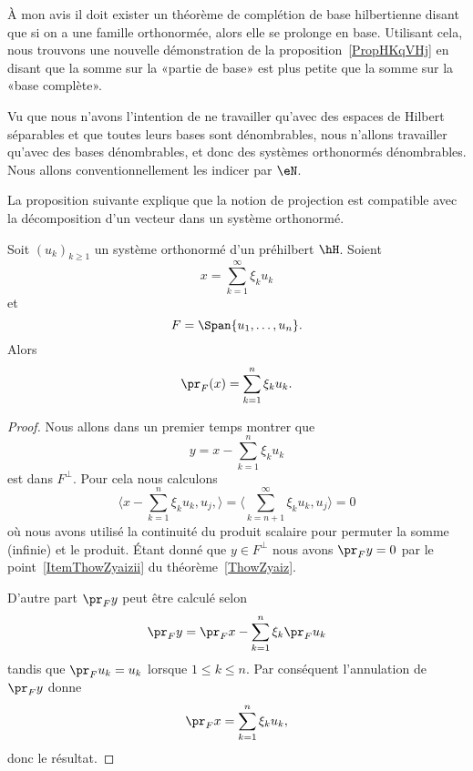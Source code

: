 \begin{remark}  \label{RemfdJcQF}
	À mon avis il doit exister un théorème de complétion de base hilbertienne disant que si on a une famille orthonormée, alors elle se prolonge en base. Utilisant cela, nous trouvons une nouvelle démonstration de la proposition~\ref{PropHKqVHj} en disant que la somme sur la «partie de base» est plus petite que la somme sur la «base complète».
\end{remark}

\begin{normaltext}
	Vu que nous n'avons l'intention de ne travailler qu'avec des espaces de Hilbert séparables et que toutes leurs bases sont dénombrables, nous n'allons travailler qu'avec des bases dénombrables, et donc des systèmes orthonormés dénombrables. Nous allons conventionnellement les indicer par \( \eN\).
\end{normaltext}

La proposition suivante explique que la notion de projection est compatible avec la décomposition d'un vecteur dans un système orthonormé.
\begin{proposition}
	Soit \( (u_k)_{k\geq 1}\) un système orthonormé d'un préhilbert \( \hH\). Soient
	\begin{equation}
		x=\sum_{k=1}^{\infty}\xi_ku_k
	\end{equation}
	et
	\begin{equation}
		F=\Span\{ u_1,\ldots, u_n \}.
	\end{equation}
	Alors
	\begin{equation}
		\pr_F(x)=\sum_{k=1}^n\xi_ku_k.
	\end{equation}
\end{proposition}

\begin{proof}
	Nous allons dans un premier temps montrer que
	\begin{equation}
		y=x-\sum_{k=1}^n\xi_ku_k
	\end{equation}
	est dans \( F^{\perp}\). Pour cela nous calculons
	\begin{equation}
		\langle x-\sum_{k=1}^n\xi_ku_k,u_j, \rangle =\langle \sum_{k=n+1}^{\infty}\xi_ku_k, u_j\rangle =0
	\end{equation}
	où nous avons utilisé la continuité du produit scalaire pour permuter la somme (infinie) et le produit. Étant donné que \( y\in F^{\perp}\) nous avons \( \pr_Fy=0\) par le point~\ref{ItemThowZyaizii} du théorème~\ref{ThowZyaiz}.

	D'autre part \( \pr_Fy\) peut être calculé selon
	\begin{equation}
		\pr_Fy=\pr_Fx-\sum_{k=1}^n\xi_k\pr_Fu_k
	\end{equation}
	tandis que \( \pr_Fu_k=u_k\) lorsque \( 1\leq k\leq n\). Par conséquent l'annulation de \( \pr_Fy\) donne
	\begin{equation}
		\pr_Fx=\sum_{k=1}^n\xi_ku_k,
	\end{equation}
	donc le résultat.
\end{proof}

